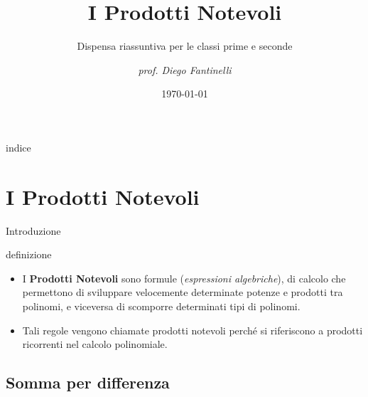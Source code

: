 \documentclass[10pt, aspectratio=169]{beamer}
\title{I Prodotti Notevoli}
\subtitle{Dispensa riassuntiva per le classi prime e seconde}
\date{\today}
\author{\em prof. Diego Fantinelli}
\institute{ITET Pasini - Schio}
\begin{document}



\maketitle



\begin{frame}{indice}
	\tableofcontents
\end{frame}

\section{I Prodotti Notevoli}

\begin{frame}{Introduzione}
    \begin{alertblock}{definizione}
        \vspace*{10pt}
        \large{ 
        \begin{itemize}
            \item I \textbf{Prodotti Notevoli} sono formule (\textit{espressioni algebriche}), di calcolo che permettono di sviluppare velocemente determinate potenze e prodotti tra polinomi, e viceversa di scomporre determinati tipi di polinomi.
            \item Tali regole vengono chiamate prodotti notevoli perché si riferiscono a prodotti ricorrenti nel calcolo polinomiale.
        \end{itemize}

        }
        \vspace*{10pt}
    \end{alertblock}
    
\end{frame}



\subsection{Somma per differenza}
\end{document}
